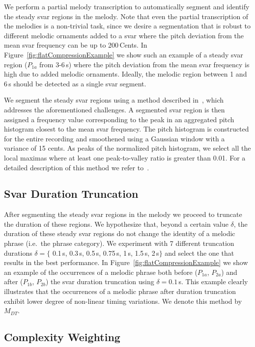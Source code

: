 We perform a partial melody transcription to automatically segment and identify the steady svar regions in the melody. Note that even the partial transcription of the melodies is a non-trivial task, since we desire a segmentation that is robust to different melodic ornaments added to a svar where the pitch deviation from the mean svar frequency can be up to 200\,Cents. In Figure~\ref{fig:flatCompressionExample} we show such an example of a steady svar region ($P_{1a}$ from 3-6\,s) where the pitch deviation from the mean svar frequency is high due to added melodic ornaments. Ideally, the melodic region between 1 and 6\,s should be detected as a single svar segment.

We segment the steady svar regions using a method described in~\cite{gulati2014Landmark}, which addresses the aforementioned challenges. A segmented svar region is then assigned a frequency value corresponding to the peak in an aggregated pitch histogram closest to the mean svar frequency. The pitch histogram is constructed for the entire recording and smoothened using a Gaussian window with a variance of 15 cents. As peaks of the normalized pitch histogram, we select all the local maximas where at least one peak-to-valley ratio is greater than 0.01. For a detailed description of this method we refer to~\cite{gulati2014Landmark}. 

\subsection{Svar Duration Truncation}
\label{svara_duration_trucation}
After segmenting the steady svar regions in the melody we proceed to truncate the duration of these regions. We hypothesize that, beyond a certain value $\delta$, the duration of these steady svar regions do not change the identity of a melodic phrase (i.e.~the phrase category). We experiment with 7 different truncation durations $\delta = \lbrace$ 0.1\,s, 0.3\,s, 0.5\,s, 0.75\,s, 1\,s, 1.5\,s, 2\,s$\rbrace$ and select the one that results in the best performance. In Figure~\ref{fig:flatCompressionExample}
we show an example of the occurrences of a melodic phrase both before ($P_{1a}$, $P_{2a}$) and after ($P_{1b}$, $P_{2b}$) the svar duration truncation using $\delta = 0.1$\,s. This example clearly illustrates that the occurrences of a melodic phrase after duration truncation exhibit lower degree of non-linear timing variations. We denote this method by $M_{DT}$.

\subsection{Complexity Weighting}
\label{sec:complexity_invariance_weighting}

